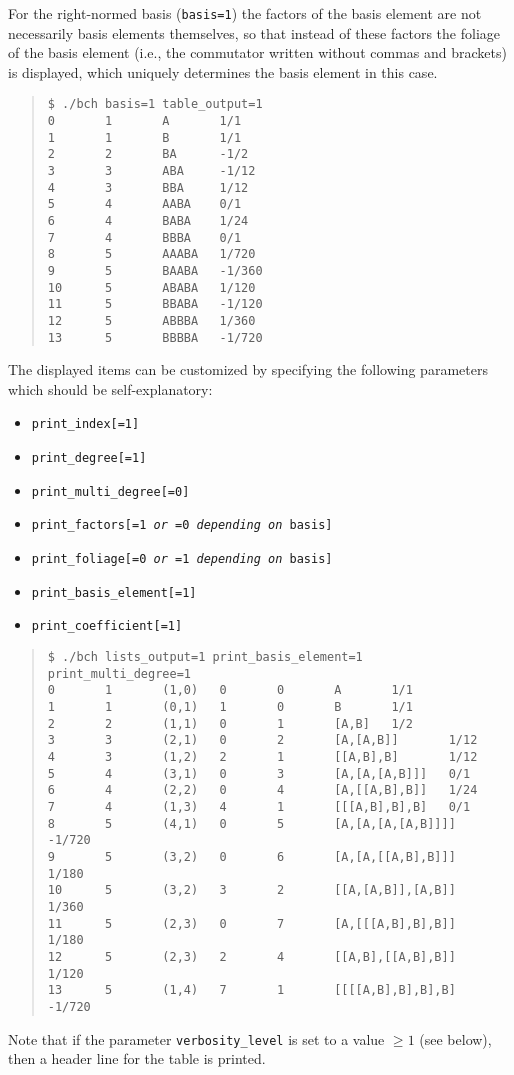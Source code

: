\documentclass[11pt,a4paper]{article}
\begin{document}
For the right-normed basis (\verb|basis=1|) the factors of
the basis element are not necessarily
basis elements themselves, so that instead of these factors the foliage 
of the basis element (i.e., the commutator written without commas and brackets)
is displayed, which uniquely determines the basis element  in this case.
\begin{quote} %
{\small\begin{BVerbatim}
$ ./bch basis=1 table_output=1
0       1       A       1/1
1       1       B       1/1
2       2       BA      -1/2
3       3       ABA     -1/12
4       3       BBA     1/12
5       4       AABA    0/1
6       4       BABA    1/24
7       4       BBBA    0/1
8       5       AAABA   1/720
9       5       BAABA   -1/360
10      5       ABABA   1/120
11      5       BBABA   -1/120
12      5       ABBBA   1/360
13      5       BBBBA   -1/720
\end{BVerbatim}
}\end{quote}
The displayed items can be customized by specifying the following parameters
which should be self-explanatory:
\begin{itemize}
\item {\tt print\_index[=1]}
\item {\tt print\_degree[=1]}
\item {\tt print\_multi\_degree[=0]}
\item {\tt print\_factors[=1 {\em or} =0 {\em depending on} basis]}
\item {\tt print\_foliage[=0 {\em or} =1 {\em depending on} basis]}
\item {\tt print\_basis\_element[=1]}
\item {\tt print\_coefficient[=1]}
\end{itemize}
\begin{quote} %
{\small\begin{BVerbatim}
$ ./bch lists_output=1 print_basis_element=1 print_multi_degree=1
0       1       (1,0)   0       0       A       1/1
1       1       (0,1)   1       0       B       1/1
2       2       (1,1)   0       1       [A,B]   1/2
3       3       (2,1)   0       2       [A,[A,B]]       1/12
4       3       (1,2)   2       1       [[A,B],B]       1/12
5       4       (3,1)   0       3       [A,[A,[A,B]]]   0/1
6       4       (2,2)   0       4       [A,[[A,B],B]]   1/24
7       4       (1,3)   4       1       [[[A,B],B],B]   0/1     
8       5       (4,1)   0       5       [A,[A,[A,[A,B]]]]       -1/720
9       5       (3,2)   0       6       [A,[A,[[A,B],B]]]       1/180
10      5       (3,2)   3       2       [[A,[A,B]],[A,B]]       1/360
11      5       (2,3)   0       7       [A,[[[A,B],B],B]]       1/180
12      5       (2,3)   2       4       [[A,B],[[A,B],B]]       1/120
13      5       (1,4)   7       1       [[[[A,B],B],B],B]       -1/720
\end{BVerbatim}
}\end{quote}
Note that if the parameter  \verb|verbosity_level| 
is set to a value $\geq 1$ (see below), then  a header line for the table 
is printed.
\end{document}
